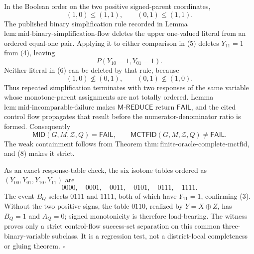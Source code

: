 In the Boolean order on the two positive signed-parent coordinates,
\[
 (1,0)\le(1,1),
 \qquad
 (0,1)\le(1,1).
\tag{5}
\]
The published binary simplification rule recorded in Lemma \(\mathrm{lem:mid\text{-}binary\text{-}simplification\text{-}flow}\) deletes the upper one-valued literal from an ordered equal-one pair.  Applying it to either comparison in (5) deletes \(Y_{11}=1\) from (4), leaving
\[
 P(Y_{10}=1,Y_{01}=1).
\tag{6}
\]
Neither literal in (6) can be deleted by that rule, because
\[
 (1,0)\not\le(0,1),
 \qquad
 (0,1)\not\le(1,0).
\tag{7}
\]
Thus repeated simplification terminates with two responses of the same variable whose monotone-parent assignments are not totally ordered.  Lemma \(\mathrm{lem:mid\text{-}incomparable\text{-}failure}\) makes \(\mathsf{M\text{-}REDUCE}\) return \(\mathsf{FAIL}\), and the cited control flow propagates that result before the numerator-denominator ratio is formed.  Consequently
\[
 \mathsf{MID}(G,M,\mathcal Z,Q)=\mathsf{FAIL},
 \qquad
 \mathsf{MCTFID}(G,M,\mathcal Z,Q)\ne\mathsf{FAIL}.
\tag{8}
\]
The weak containment follows from Theorem \(\mathrm{thm:finite\text{-}oracle\text{-}complete\text{-}mctfid}\), and (8) makes it strict.

As an exact response-table check, the six isotone tables ordered as \((Y_{00},Y_{01},Y_{10},Y_{11})\) are
\[
 0000,\quad 0001,\quad 0011,\quad 0101,\quad 0111,\quad 1111.
\]
The event \(B_Q\) selects \(0111\) and \(1111\), both of which have \(Y_{11}=1\), confirming (3).  Without the two positive signs, the table \(0110\), realized by \(Y=X\mathbin{\oplus}Z\), has \(B_Q=1\) and \(A_Q=0\); signed monotonicity is therefore load-bearing.  The witness proves only a strict control-flow success-set separation on this common three-binary-variable subclass.  It is a regression test, not a district-local completeness or gluing theorem. \(\square\)